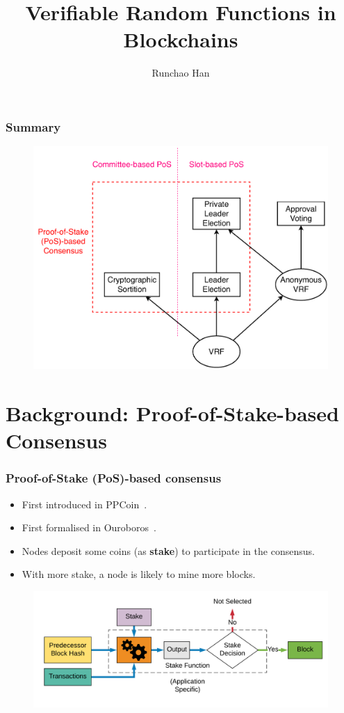 \documentclass{beamer}
\title{Verifiable Random Functions in Blockchains}
\author{Runchao Han}
\institute{}
\date{}
\begin{document}
\frame{\titlepage}


\begin{frame}
\frametitle{Summary}

\begin{figure}
    \centering
    \includegraphics[width=.7\textwidth]{figs/overview.pdf}
\end{figure}

\end{frame}


\section{Background: Proof-of-Stake-based Consensus}

\begin{frame}
\frametitle{Proof-of-Stake (PoS)-based consensus}

\begin{itemize}
    \item First introduced in PPCoin~\cite{king2012ppcoin}.
    \item First formalised in Ouroboros~\cite{kiayias2017ouroboros}.
    \item Nodes deposit some coins (as \textbf{stake}) to participate in the consensus.
    \item With more stake, a node is likely to mine more blocks.
\end{itemize}

\begin{figure}
    \centering
    \includegraphics[width=.8\textwidth]{figs/pos-overview.png}
\end{figure}

\end{frame}
\end{document}
